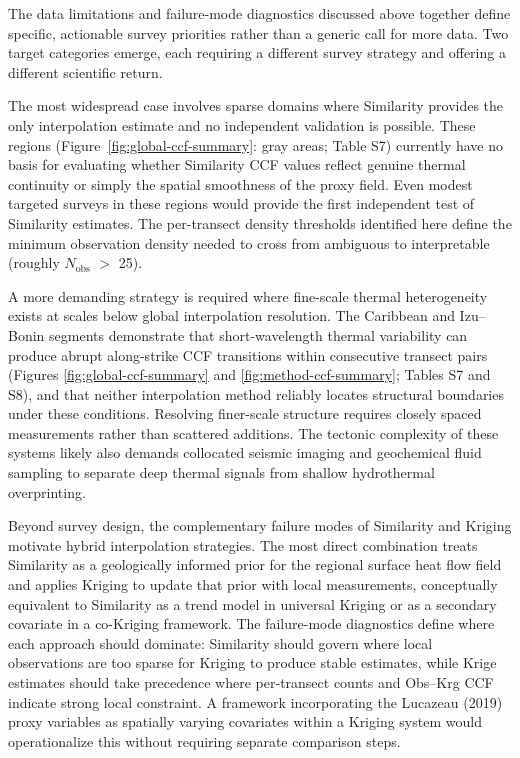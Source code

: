 \documentclass[draft,linenumbers]{agujournal2019}
\begin{document}
The data limitations and failure-mode diagnostics discussed above
together define specific, actionable survey priorities rather than a
generic call for more data. Two target categories emerge, each requiring
a different survey strategy and offering a different scientific return.

The most widespread case involves sparse domains where Similarity
provides the only interpolation estimate and no independent validation
is possible. These regions (Figure~\ref{fig:global-ccf-summary}: gray
areas; Table S7) currently have no basis for evaluating whether
Similarity CCF values reflect genuine thermal continuity or simply the
spatial smoothness of the proxy field. Even modest targeted surveys in
these regions would provide the first independent test of Similarity
estimates. The per-transect density thresholds identified here define
the minimum observation density needed to cross from ambiguous to
interpretable (roughly \(N_\mathrm{obs}\) \(>\) 25).

A more demanding strategy is required where fine-scale thermal
heterogeneity exists at scales below global interpolation resolution.
The Caribbean and Izu--Bonin segments demonstrate that short-wavelength
thermal variability can produce abrupt along-strike CCF transitions
within consecutive transect pairs (Figures \ref{fig:global-ccf-summary}
and \ref{fig:method-ccf-summary}; Tables S7 and S8), and that neither
interpolation method reliably locates structural boundaries under these
conditions. Resolving finer-scale structure requires closely spaced
measurements rather than scattered additions. The tectonic complexity of
these systems likely also demands collocated seismic imaging and
geochemical fluid sampling to separate deep thermal signals from shallow
hydrothermal overprinting.

Beyond survey design, the complementary failure modes of Similarity and
Kriging motivate hybrid interpolation strategies. The most direct
combination treats Similarity as a geologically informed prior for the
regional surface heat flow field and applies Kriging to update that
prior with local measurements, conceptually equivalent to Similarity as
a trend model in universal Kriging or as a secondary covariate in a
co-Kriging framework. The failure-mode diagnostics define where each
approach should dominate: Similarity should govern where local
observations are too sparse for Kriging to produce stable estimates,
while Krige estimates should take precedence where per-transect counts
and Obs--Krg CCF indicate strong local constraint. A framework
incorporating the Lucazeau (2019) proxy variables as spatially varying
covariates within a Kriging system would operationalize this without
requiring separate comparison steps.
\end{document}
